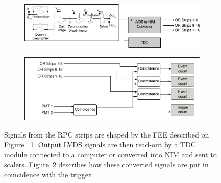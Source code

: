 			\begin{figure}[!h]
			\begin{subfigure}{\linewidth}
				\begin{center}
					\includegraphics[width = \plotwidth]{fig/pulse-processing.pdf}\\
					\caption{\label{fig:DAQ:A}}
				\end{center}
			\end{subfigure}
			\begin{subfigure}{\linewidth}
				\begin{center}
					\includegraphics[width = \plotwidth]{fig/pulse-processing-2.pdf}
					\caption{\label{fig:DAQ:B}}
				\end{center}
			\end{subfigure}
			\caption{\label{fig:DAQ} Signals from the RPC strips are shaped by the FEE described on Figure ~\ref{fig:DAQ:A}. Output LVDS signals are then read-out by a TDC module connected to a computer or converted into NIM and sent to scalers. Figure~\ref{fig:DAQ:B} describes how these converted signals are put in coincidence with the trigger.}
		\end{figure}
		
